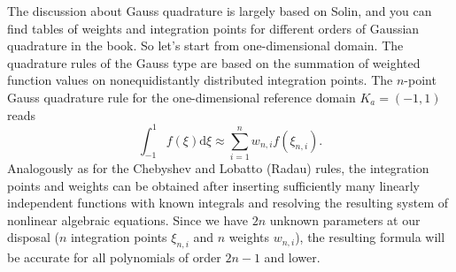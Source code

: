 \documentclass{develop-note}
\begin{document}
The discussion about Gauss quadrature is largely based on Solin\cite{solinHigherOrderFiniteElement2003}, and you can find tables of weights and integration points for different orders of Gaussian quadrature in the book. So let's start from one-dimensional domain. The quadrature rules of the Gauss type are based on the summation of weighted function values on nonequidistantly distributed integration points. The $n$-point Gauss quadrature rule for the one-dimensional reference domain $K_{a}=(-1,1)$ reads
\begin{equation}
  \int_{-1}^{1}f(\xi)\mathrm{d}\xi\approx\sum_{i=1}^{n}w_{n,i}f(\xi_{n,i}).
\end{equation}
Analogously as for the Chebyshev and Lobatto (Radau) rules, the integration points and weights can be obtained after inserting sufficiently many linearly independent functions with known integrals and resolving the resulting system of nonlinear algebraic equations. Since we have $2n$ unknown parameters at our disposal ($n$ integration points $\xi_{n,i}$ and $n$ weights $w_{n,i}$), the resulting formula will be accurate for all polynomials of order $2n-1$ and lower.
\end{document}
